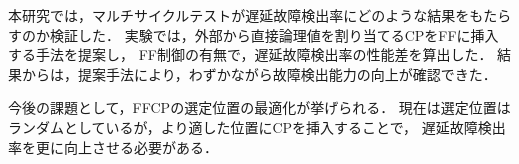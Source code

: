 
本研究では，マルチサイクルテストが遅延故障検出率にどのような結果をもたらすのか検証した．
実験では，外部から直接論理値を割り当てるCPをFFに挿入する手法を提案し，
FF制御の有無で，遅延故障検出率の性能差を算出した．
結果からは，提案手法により，わずかながら故障検出能力の向上が確認できた．

今後の課題として，FFCPの選定位置の最適化が挙げられる．
現在は選定位置はランダムとしているが，より適した位置にCPを挿入することで，
遅延故障検出率を更に向上させる必要がある．